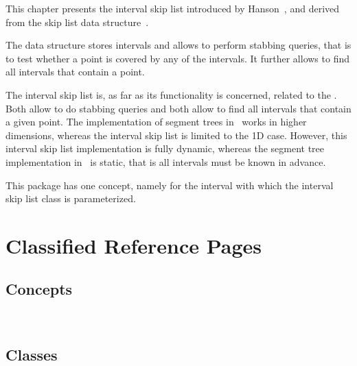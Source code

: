 This chapter presents the interval skip list introduced by Hanson~\cite{h-islds-91},
and derived from the skip list data structure~\cite{p-slpab-90}.

The data structure stores intervals and allows to perform stabbing queries,
that is to test whether a point is covered by any of the intervals.
It further allows to find all intervals that contain a point.

The interval skip list is, as far as its functionality is concerned,
related to the . Both allow to do stabbing queries
and both allow to find all intervals that contain a given point.  The
implementation of segment trees in \cgal\ works in higher
dimensions, whereas the interval skip list is limited to the 1D
case. However, this interval skip list implementation is fully
dynamic, whereas the segment tree implementation in \cgal\ is
static, that is all intervals must be known in advance.

This package has one concept, namely for the interval with which 
the interval skip list class is parameterized.



\section{Classified Reference Pages}

\subsection*{Concepts}

\\


\subsection*{Classes}

\\
\\
\\


